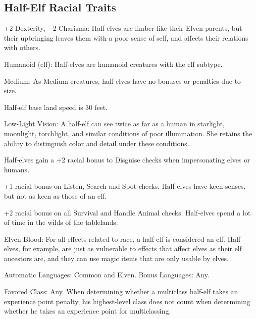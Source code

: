 \subsection{Half-Elf Racial Traits}
\begin{itemize*}
    \item +2 Dexterity, $-2$ Charisma: Half‐elves are limber like their Elven parents, but their upbringing leaves them with a poor sense of self, and affects their relations with others.
    \item Humanoid (elf): Half‐elves are humanoid creatures with the elf subtype.
    \item Medium: As Medium creatures, half‐elves have no bonuses or penalties due to size.
    \item Half‐elf base land speed is 30 feet.
    \item Low-Light Vision: A half-elf can see twice as far as a human in starlight, moonlight, torchlight, and similar conditions of poor illumination. She retains the ability to distinguish color and detail under these conditions..
    \item Half‐elves gain a +2 racial bonus to Disguise checks when impersonating elves or humans.
    \item +1 racial bonus on Listen, Search and Spot checks. Half‐elves have keen senses, but not as keen as those of an elf.
    \item +2 racial bonus on all Survival and Handle Animal checks. Half‐elves spend a lot of time in the wilds of the tablelands.
    \item Elven Blood: For all effects related to race, a half‐elf is considered an elf. Half‐elves, for example, are just as vulnerable to effects that affect elves as their elf ancestors are, and they can use magic items that are only usable by elves.
    \item Automatic Languages: Common and Elven. Bonus Languages: Any.
    \item Favored Class: Any. When determining whether a multiclass half‐elf takes an experience point penalty, his highest-level class does not count when determining whether he takes an experience point for multiclassing.
\end{itemize*}